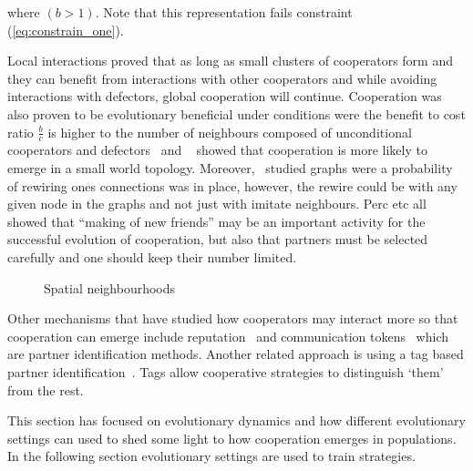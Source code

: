 \documentclass{article}
\theoremstyle{definition}
\begin{document}
where \((b>1)\). Note that this representation fails constraint (\ref{eq:constrain_one}).

Local interactions proved that as long as small clusters of cooperators form and
they can benefit from interactions with other cooperators and while avoiding
interactions with defectors, global cooperation will continue.
Cooperation was also proven to be evolutionary beneficial under conditions were
the benefit to cost ratio \(\frac{b}{c}\) is higher to the number of neighbours
composed of unconditional cooperators and defectors~\cite{Ohtsuki2006} and
~\cite{MASUDA2003} showed that cooperation is more likely to emerge in a
small world topology. Moreover,~\cite{Perc2011}
studied graphs were a probability of rewiring ones connections was in place,
however, the rewire could be with any given node in the graphs and not just
with imitate neighbours. Perc etc all showed that ``making of new friends'' may
be an important activity for the successful evolution of cooperation,
but also that partners must be selected carefully and one should keep their number
limited.

\begin{figure}[!hbtp]
\centering
    \begin{subfigure}{.25\textwidth}
        
    \end{subfigure}
    \begin{subfigure}{.25\textwidth}\centering
        
     \end{subfigure}
     \begin{subfigure}{.25\textwidth}\centering
        
     \end{subfigure}
     \caption{Spatial neighbourhoods}\label{fig:topologies}
    \end{figure}

Other mechanisms that have studied how cooperators may interact more so that
cooperation can emerge include reputation~\cite{janssen2006, nowak1998, suzuki2005}
and communication tokens~\cite{miller2002} which are partner identification methods.
Another related approach is using a tag based partner identification~\cite{choi2006,
hales2000, miller2002, riolo2001}. Tags allow cooperative strategies to distinguish
`them' from the rest.

This section has focused on evolutionary dynamics and how different evolutionary
settings can used to shed some light to how cooperation emerges in populations.
In the following section evolutionary settings are used to train strategies.
\end{document}
